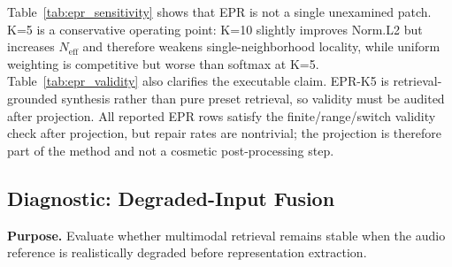 \begin{table}[t]
\centering
\caption{Protocol-B validity and repair audit for EPR-K5. Validity is measured after projection: numeric leaves must be finite and within the observed KB range, and switch roots must not contain mutually active On/Off states. Repair records whether projection changed the pre-projection blend.}
\label{tab:epr_validity}
\small
\setlength{\tabcolsep}{4pt}
\end{table}

Table~\ref{tab:epr_sensitivity} shows that EPR is not a single unexamined patch. K=5 is a conservative operating point: K=10 slightly improves Norm.L2 but increases $N_{\mathrm{eff}}$ and therefore weakens single-neighborhood locality, while uniform weighting is competitive but worse than softmax at K=5. Table~\ref{tab:epr_validity} also clarifies the executable claim. EPR-K5 is retrieval-grounded synthesis rather than pure preset retrieval, so validity must be audited after projection. All reported EPR rows satisfy the finite/range/switch validity check after projection, but repair rates are nontrivial; the projection is therefore part of the method and not a cosmetic post-processing step.

\subsection{Diagnostic: Degraded-Input Fusion}
\label{ssec:protocolC}

\textbf{Purpose.} Evaluate whether multimodal retrieval remains stable when the audio reference is realistically degraded before representation extraction.

